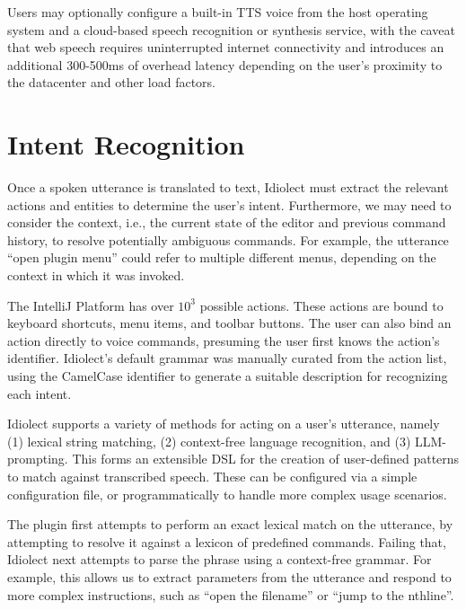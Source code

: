 \documentclass[conference]{IEEEtran}
\begin{document}

Users may optionally configure a built-in TTS voice from the host operating system and a cloud-based speech recognition or synthesis service, with the caveat that web speech requires uninterrupted internet connectivity and introduces an additional 300-500ms of overhead latency depending on the user's proximity to the datacenter and other load factors.

\section{Intent Recognition}

Once a spoken utterance is translated to text, Idiolect must extract the relevant actions and entities to determine the user's intent. Furthermore, we may need to consider the context, i.e., the current state of the editor and previous command history, to resolve potentially ambiguous commands. For example, the utterance ``open plugin menu'' could refer to multiple different menus, depending on the context in which it was invoked.

The IntelliJ Platform has over $10^3$ possible actions. These actions are bound to keyboard shortcuts, menu items, and toolbar buttons. The user can also bind an action directly to voice commands, presuming the user first knows the action's identifier. Idiolect's default grammar was manually curated from the action list, using the CamelCase identifier to generate a suitable description for recognizing each intent.

Idiolect supports a variety of methods for acting on a user's utterance, namely (1) lexical string matching, (2) context-free language recognition, and (3) LLM-prompting. This forms an extensible DSL for the creation of user-defined patterns to match against transcribed speech. These can be configured via a simple configuration file, or programmatically to handle more complex usage scenarios.

The plugin first attempts to perform an exact lexical match on the utterance, by attempting to resolve it against a lexicon of predefined commands. Failing that, Idiolect next attempts to parse the phrase using a context-free grammar. For example, this allows us to extract parameters from the utterance and respond to more complex instructions, such as ``open the \textlangle filename'' or ``jump to the \textlangle nth\textrangle line''.
\end{document}
